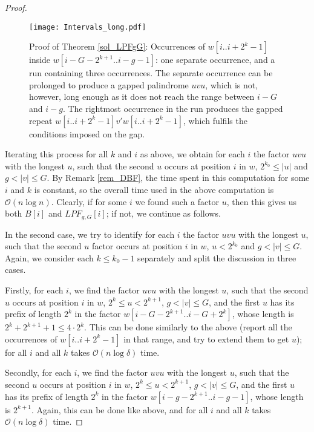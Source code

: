 \documentclass[final]{dmtcs-episciences}
\newcommand{\bigo}{{\mathcal O}}
\newcommand{\LPdF}{{\mathit{LPF}}}
\begin{document}
\begin{proof}
\begin{figure}\begin{center}
\texttt{[image: Intervals\_long.pdf]}
\end{center}
\vspace{-0.5cm}
\caption{Proof of Theorem \ref{sol_LPFgG}: Occurrences of $w[i..i+2^k-1]$ inside $w[i-G-2^{k+1}..i-g-1]$: one separate occurrence, and a run containing three occurrences. The separate occurrence can be prolonged to produce a gapped palindrome $uvu$, which is not, however, long enough as it does not reach the range between $i-G$ and $i-g$. The rightmost occurrence in the run produces the gapped repeat $w[i..i+2^k-1] v' w[i..i+2^k-1]$, which fulfils the conditions imposed on the gap.}
\end{figure}


Iterating this process for all $k$ and $i$ as above, we obtain for each $i$ the factor $uvu$ with the longest $u$, such that the second $u$ occurs at position $i$ in $w$, $ 2^{k_0} \leq |u|$ and $g<|v|\leq G$.
By Remark \ref{rem_DBF}, the time spent in this computation for some $i$ and $k$ is constant, so the overall time used in the above computation is $\bigo(n\log n)$. Clearly, if for some $i$ we found such a factor $u$, then this gives us both $B[i]$ and $\LPdF_{g,G}[i]$; if not, we continue as follows.

In the second case, we try to identify  for each $i$ the factor $uvu$ with the longest $u$, such that the second $u$ factor occurs at position $i$ in $w$, $u<  2^{k_0}$ and $g<|v|\leq G$. Again, we consider each $k\leq k_0-1$ separately and split the discussion in three cases.

Firstly, for each $i$, we find the factor $uvu$ with the longest $u$, such that the second $u$ occurs at position $i$ in $w$, $2^k \leq u<  2^{k+1}$, $g<|v|\leq G$, and the first $u$ has its prefix of length $2^k$ in the factor $w[i-G-2^{k+1}..i-G+2^k]$, whose length is $2^k+2^{k+1}+1\leq 4\cdot 2^k$. This can be done similarly to the above (report all the occurrences of $w[i..i+2^k-1]$ in that range, and try to extend them to get $u$); for all $i$ and all $k$ takes $\bigo(n\log \delta)$ time. 

Secondly, for each $i$, we find the factor $uvu$ with the longest $u$, such that the second $u$ occurs at position $i$ in $w$, $2^k \leq u<  2^{k+1}$, $g<|v|\leq G$, and the first $u$ has its prefix of length $2^k$ in the factor $w[i-g-2^{k+1}..i-g-1]$, whose length is $2^{k+1}$. Again, this can be done like above, and for all $i$ and all $k$ takes $\bigo(n\log \delta)$ time. 


\end{proof}
\end{document}
